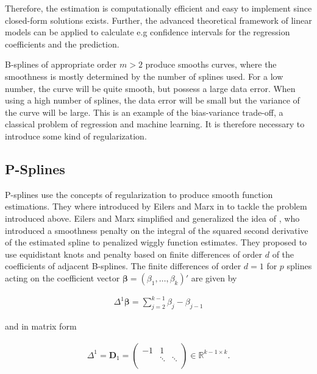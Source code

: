 \documentclass[10pt,a4paper]{article}
\begin{document}
Therefore, the estimation is computationally efficient and easy to implement since closed-form solutions exists. Further, the advanced theoretical framework of linear models can be applied to calculate e.g confidence intervals for the regression coefficients and the prediction.

B-splines of appropriate order $m > 2$ produce smooths curves, where the smoothness is mostly determined by the number of splines used. For a low number, the curve will be quite smooth, but possess a large data error. When using a high number of splines, the data error will be small but the variance of the curve will be large. This is an example of the bias-variance trade-off, a classical problem of regression and machine learning. It is therefore necessary to introduce some kind of regularization. \cite{deBoor1978practicalGuideToSplines}  

\subsection{P-Splines} \label{subsec:Pspline}

P-splines use the concepts of regularization to produce smooth function estimations. They where introduced by Eilers and Marx in \cite{eilers1996flexible} to tackle the problem introduced above. Eilers and Marx simplified and generalized the idea of \cite{osullivan1986statistical}, who introduced a smoothness penalty on the integral of the squared second derivative of the estimated spline to penalized wiggly function estimates. They proposed to use equidistant knots and penalty based on finite differences of order $d$ of the coefficients of adjacent B-splines. The finite differences of order $d=1$ for $p$ splines acting on the coefficient vector $\boldsymbol{\beta} = (\beta_1, \dots, \beta_k)'$ are given by

\begin{align}
	\Delta^1 \boldsymbol{\beta} = \sum_{j=2}^{k-1} \beta_{j} - \beta_{j-1}
\end{align}

and in matrix form

\begin{align}
	\Delta^1 = \boldsymbol{D}_1 = \begin{pmatrix} -1 & 1 \\ 
		                                             & \ddots & \ddots \\   
	                              \end{pmatrix} \in \mathbb{R}^{k-1 \times k}.
\end{align}
\end{document}
